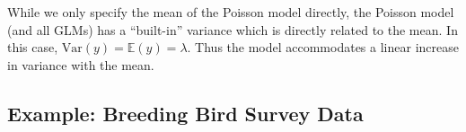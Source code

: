 While we only specify the mean of the Poisson model directly, the
Poisson model (and all GLMs) has a ``built-in'' variance which is
directly related to the mean. In this case, $\mbox{Var}(y) = \mathbb{E}(y) =
\lambda$. Thus the model accommodates a linear increase in variance
with the mean.



\subsection{Example: Breeding Bird Survey Data}

